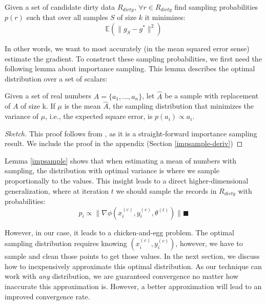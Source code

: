 \begin{definition}
Given a set of candidate dirty data $R_{dirty}$, $\forall r \in R_{dirty}$ find sampling probabilities $p(r)$ such that over all samples $S$ of size $k$ it minimizes:
\[
\mathbb{E}(\|g_S - g^*\|^2)
\]
\end{definition}
In other words, we want to most accurately (in the mean squared error sense) estimate the gradient. 
To construct these sampling probabilities, we first need the following lemma about importance sampling.
This lemma describes the optimal distribution over a set of scalars:
\begin{lemma}\label{impsample}
Given a set of real numbers $A = \{a_1,...,a_n\}$, let $\hat{A}$ be 
a sample with replacement of $A$ of size k.
If $\mu$ is the mean $\hat{A}$, the sampling distribution that minimizes
 the variance of $\mu$, i.e., the expected square error, is $p(a_i) \propto a_i$.
\end{lemma}
\begin{proof}[Sketch]
This proof follows from \cite{mcbook}, as it is a straight-forward importance sampling result.
We include the proof in the appendix (Section \ref{impsample-deriv})
\end{proof}

Lemma \ref{impsample} shows that when estimating a mean of numbers with sampling, the distribution with optimal variance is where we sample proportionally to the values.
This insight leads to a direct higher-dimensional generalization, where at iteration $t$ we should sample the records in $R_{dirty}$ with probabilities:
\[
p_i \propto \|\nabla\phi(x^{(c)}_i,y^{(c)}_i,\theta^{(t)})\| \blacksquare
\]

However, in our case, it leads to a chicken-and-egg problem.
The optimal sampling distribution requires knowing $(x^{(c)}_i,y^{(c)}_i)$, however, we have to sample and clean those points to get those values.
In the next section, we discuss how to inexpensively approximate this optimal distribution.
As our technique can work with \emph{any} distribution, we are guaranteed convergence no matter how inaccurate this approximation is.
However, a better approximation will lead to an improved convergence rate.
